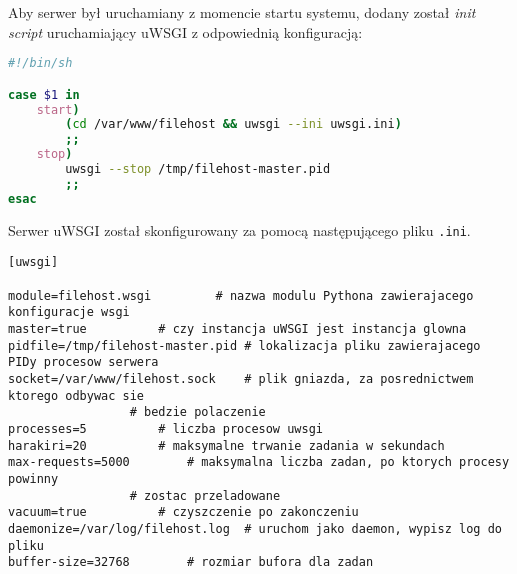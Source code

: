 \documentclass[10pt,a4paper]{article}
\begin{document}
Aby serwer był uruchamiany z momencie startu systemu, dodany został \emph{init script}
uruchamiający uWSGI z odpowiednią konfiguracją:
\begin{lstlisting}[language=bash,caption=Zawartość pliku \directory{/etc/init.d/S49filehost}]
#!/bin/sh

case $1 in
	start)
		(cd /var/www/filehost && uwsgi --ini uwsgi.ini)
		;;
	stop)
		uwsgi --stop /tmp/filehost-master.pid
		;;
esac
\end{lstlisting}
Serwer uWSGI został skonfigurowany za pomocą następującego pliku \texttt{.ini}.
\begin{lstlisting}[caption=Zawartość pliku \directory{/var/www/filehost/uwsgi.ini}]
[uwsgi]

module=filehost.wsgi		 # nazwa modulu Pythona zawierajacego konfiguracje wsgi
master=true			 # czy instancja uWSGI jest instancja glowna
pidfile=/tmp/filehost-master.pid # lokalizacja pliku zawierajacego PIDy procesow serwera
socket=/var/www/filehost.sock    # plik gniazda, za posrednictwem ktorego odbywac sie
				 # bedzie polaczenie
processes=5			 # liczba procesow uwsgi
harakiri=20			 # maksymalne trwanie zadania w sekundach
max-requests=5000		 # maksymalna liczba zadan, po ktorych procesy powinny
				 # zostac przeladowane
vacuum=true			 # czyszczenie po zakonczeniu
daemonize=/var/log/filehost.log	 # uruchom jako daemon, wypisz log do pliku
buffer-size=32768		 # rozmiar bufora dla zadan
\end{lstlisting}
\end{document}
